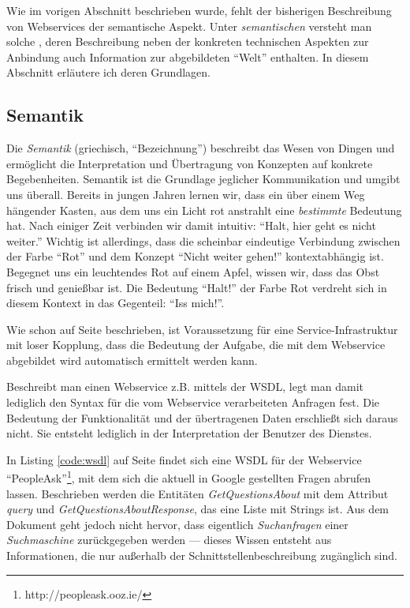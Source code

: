 Wie im vorigen Abschnitt beschrieben wurde, fehlt der bisherigen Beschreibung von Webservices der semantische Aspekt. Unter \emph{semantischen \ws} versteht man solche \ws, deren Beschreibung neben der konkreten technischen Aspekten zur Anbindung auch Information zur abgebildeten "`Welt"' enthalten. In diesem Abschnitt erläutere ich deren Grundlagen.

\subsection{Semantik}

Die \emph{Semantik} (griechisch, "`Bezeichnung"') beschreibt das Wesen von Dingen und ermöglicht die Interpretation und Übertragung von Konzepten auf konkrete Begebenheiten. Semantik ist die Grundlage jeglicher Kommunikation und umgibt uns überall. Bereits in jungen Jahren lernen wir, dass ein über einem Weg hängender Kasten, aus dem uns ein Licht rot anstrahlt eine \emph{bestimmte} Bedeutung hat. Nach einiger Zeit verbinden wir damit intuitiv: "`Halt, hier geht es nicht weiter."' Wichtig ist allerdings, dass die scheinbar eindeutige Verbindung zwischen der Farbe "`Rot"' und dem Konzept "`Nicht weiter gehen!"' kontextabhängig ist. Begegnet uns ein leuchtendes Rot auf einem Apfel, wissen wir, dass das Obst frisch und genießbar ist. Die Bedeutung "`Halt!"' der Farbe Rot verdreht sich in diesem Kontext in das Gegenteil: "`Iss mich!"'.

Wie schon auf Seite \pageref{l:intro-loosecoupling} beschrieben, ist Voraussetzung für eine Service-Infrastruktur mit loser Kopplung, dass die Bedeutung der Aufgabe, die mit dem Webservice abgebildet wird automatisch ermittelt werden kann.

Beschreibt man einen Webservice z.B. mittels der \ac{WSDL}, legt man damit lediglich den Syntax für die vom Webservice verarbeiteten Anfragen fest. Die Bedeutung der Funktionalität und der übertragenen Daten erschließt sich daraus nicht. Sie entsteht lediglich in der Interpretation der Benutzer des Dienstes. 

In Listing \ref{code:wsdl} auf Seite \pageref{code:wsdl} findet sich eine \ac{WSDL} für der Webservice "`PeopleAsk"'\footnote{http://peopleask.ooz.ie/}, mit dem sich die aktuell in Google gestellten Fragen abrufen lassen. Beschrieben werden die Entitäten \emph{GetQuestionsAbout} mit dem Attribut \emph{query} und \emph{GetQuestionsAboutResponse}, das eine Liste mit Strings ist. Aus dem Dokument geht jedoch nicht hervor, dass eigentlich \emph{Suchanfragen} einer \emph{Suchmaschine} zurückgegeben werden --- dieses Wissen entsteht aus Informationen, die nur außerhalb der Schnittstellenbeschreibung zugänglich sind.

